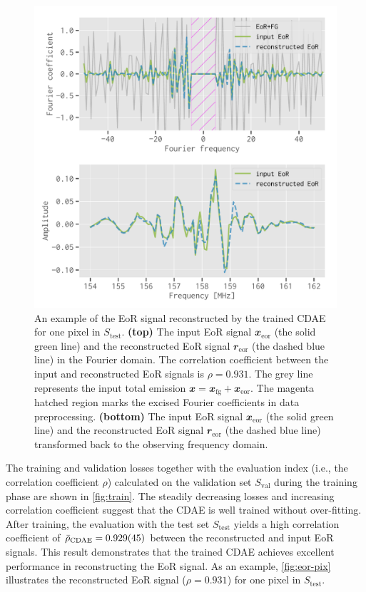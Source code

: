 \documentclass[fleqn,usenatbib]{mnras}
\newcommand{\R}[1]{\mathrm{#1}}
\newcommand{\B}[1]{\mathbfit{#1}}
\newcommand{\editone}[1]{{\leavevmode\color{cyan}#1}}
\newcommand{\edittwo}[1]{{\leavevmode\color{magenta}#1}}
\begin{document}
\begin{figure}
  \centering
  \includegraphics[width=\columnwidth]{eor-result}
  \caption{\label{fig:eor-pix}%
    An example of the EoR signal reconstructed by the trained CDAE for
    one pixel \editone{in $S_{\R{test}}$}.
    \textbf{(top)} The input EoR signal $\B{x}_{\R{eor}}$ (the solid
    green line) and the reconstructed EoR signal $\B{r}_{\R{eor}}$
    (the dashed blue line) in the Fourier domain.
    \editone{The correlation coefficient between the input and
      reconstructed EoR signals is $\rho = 0.931$.}
    The grey line represents the input total emission
    $\B{x} = \B{x}_{\R{fg}} + \B{x}_{\R{eor}}$.
    The magenta hatched region marks the excised Fourier coefficients
    in data preprocessing.
    \textbf{(bottom)} The input EoR signal $\B{x}_{\R{eor}}$ (the solid
    green line) and the reconstructed EoR signal $\B{r}_{\R{eor}}$
    (the dashed blue line) transformed back to the observing frequency
    domain.
  }
\end{figure}

The training and validation losses together with the evaluation index
(i.e., the correlation coefficient $\rho$) calculated on the validation set
$S_{\R{val}}$ during the training phase are shown in \autoref{fig:train}.
The steadily decreasing losses and increasing correlation coefficient
suggest that the CDAE is well trained without over-fitting.
\editone{%
After training, the evaluation with the test set $S_{\R{test}}$ yields a
high correlation coefficient of $\bar{\rho}_{\R{CDAE}} = \num{0.929 +- 0.045}$
between the reconstructed and input EoR signals.
\edittwo{This result demonstrates}
that the trained CDAE achieves excellent performance in reconstructing the
EoR signal.} %
As an example, \autoref{fig:eor-pix} illustrates the reconstructed EoR
signal (\editone{$\rho = 0.931$}) for one pixel \editone{in $S_{\R{test}}$}.
\end{document}

